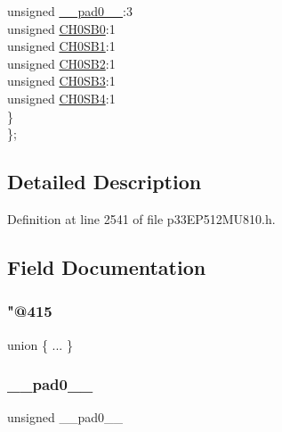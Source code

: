 \begin{DoxyCompactItemize}
\begin{tabbing}
\>\>unsigned \hyperlink{structtag_a_d1_c_h_s0_b_i_t_s_adf71f3d8410c1f1dbbc96680a92c49af}{\_\_pad0\_\_}:3\\
\>\>unsigned \hyperlink{structtag_a_d1_c_h_s0_b_i_t_s_aa9c32b5f5663d118afa09df2e2e2de08}{CH0SB0}:1\\
\>\>unsigned \hyperlink{structtag_a_d1_c_h_s0_b_i_t_s_a20fdb9b36c1ea4d133f87ed606c1cf4c}{CH0SB1}:1\\
\>\>unsigned \hyperlink{structtag_a_d1_c_h_s0_b_i_t_s_aa10291da07f490db16ef1d6a640b4c5d}{CH0SB2}:1\\
\>\>unsigned \hyperlink{structtag_a_d1_c_h_s0_b_i_t_s_a5c8a75088c6230c9b21151f9f86fb142}{CH0SB3}:1\\
\>\>unsigned \hyperlink{structtag_a_d1_c_h_s0_b_i_t_s_a4f65ab47f0d8e69cd9826d4a74fb614b}{CH0SB4}:1\\
\>\} \\
\}; \\

\end{tabbing}\end{DoxyCompactItemize}


\subsection{Detailed Description}


Definition at line 2541 of file p33\+E\+P512\+M\+U810.\+h.



\subsection{Field Documentation}
\mbox{\label{structtag_a_d1_c_h_s0_b_i_t_s_ad4ca2b9459728cd2695fbe8142682e25}} 
\subsubsection{\texorpdfstring{"@415}{@415}}
{\footnotesize\ttfamily union \{ ... \} }

\mbox{\label{structtag_a_d1_c_h_s0_b_i_t_s_adf71f3d8410c1f1dbbc96680a92c49af}} 
\subsubsection{\texorpdfstring{\+\_\+\+\_\+pad0\+\_\+\+\_\+}{\_\_pad0\_\_}}
{\footnotesize\ttfamily unsigned \+\_\+\+\_\+pad0\+\_\+\+\_\+}



